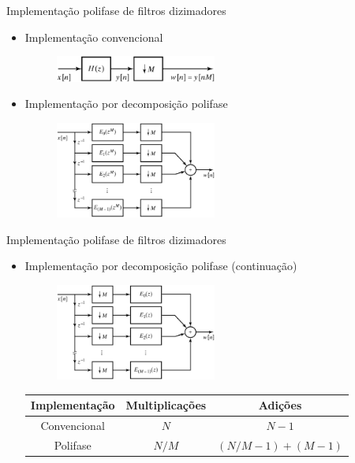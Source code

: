 \documentclass[
size=11pt,
paper=screen,
mode=present,
display=slidesnotes,
style=paintings,
nopagebreaks,
blackslide,
fleqn]{powerdot}
\begin{document}
\begin{slide}{Implementação polifase de filtros dizimadores}
	\begin{itemize}
		\item Implementação convencional
			\begin{figure}
				\centering
				\includegraphics[width=0.5\textwidth]{figs/4-38.eps}
			\end{figure}
		\item Implementação por decomposição polifase
			\begin{figure}
				\centering
				\includegraphics[width=0.5\textwidth]{figs/4-39.eps}
			\end{figure}
	\end{itemize}
\end{slide}

\begin{slide}{Implementação polifase de filtros dizimadores}
	\begin{itemize}
		\item Implementação por decomposição polifase (continuação)
			\begin{figure}
				\centering
				\includegraphics[width=0.5\textwidth]{figs/4-40.eps}
			\end{figure}
			\begin{table}
				\begin{tabular}[h]{c|c|c}
					\hline
					Implementação & Multiplicações & Adições\\
				        \hline	
					Convencional &   $N$ & $N-1$ \\
					Polifase     & $N/M$ & $(N/M -1 )+(M-1)$\\
					\hline
				\end{tabular}
			\end{table}
	\end{itemize}
\end{slide}
\end{document}
